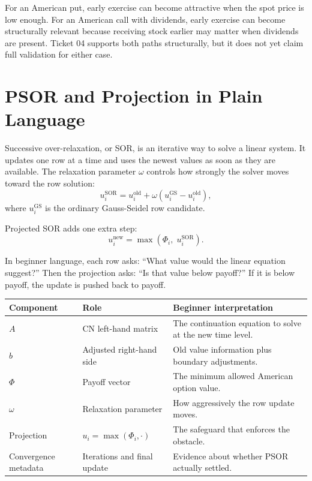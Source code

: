 \documentclass[11pt,a4paper]{article}
\begin{document}
For an American put, early exercise can become attractive when the spot price is low enough. For
an American call with dividends, early exercise can become structurally relevant because receiving
stock earlier may matter when dividends are present. Ticket 04 supports both paths structurally,
but it does not yet claim full validation for either case.

\section{PSOR and Projection in Plain Language}

Successive over-relaxation, or SOR, is an iterative way to solve a linear system. It updates one
row at a time and uses the newest values as soon as they are available. The relaxation parameter
\(\omega\) controls how strongly the solver moves toward the row solution:
\begin{equation}
  u_i^{\mathrm{SOR}} =
  u_i^{\mathrm{old}}
  + \omega\left(u_i^{\mathrm{GS}} - u_i^{\mathrm{old}}\right),
\end{equation}
where \(u_i^{\mathrm{GS}}\) is the ordinary Gauss-Seidel row candidate.

Projected SOR adds one extra step:
\begin{equation}
  u_i^{\mathrm{new}} =
  \max\left(\Phi_i,\; u_i^{\mathrm{SOR}}\right).
\end{equation}

In beginner language, each row asks: ``What value would the linear equation suggest?'' Then the
projection asks: ``Is that value below payoff?'' If it is below payoff, the update is pushed back
to payoff.

\begin{longtable}{L{0.24\textwidth}L{0.31\textwidth}L{0.33\textwidth}}
\toprule
Component & Role & Beginner interpretation \\
\midrule
\endhead
\(A\) & CN left-hand matrix & The continuation equation to solve at the new time level. \\
\(b\) & Adjusted right-hand side & Old value information plus boundary adjustments. \\
\(\Phi\) & Payoff vector & The minimum allowed American option value. \\
\(\omega\) & Relaxation parameter & How aggressively the row update moves. \\
Projection & \(u_i=\max(\Phi_i,\cdot)\) & The safeguard that enforces the obstacle. \\
Convergence metadata & Iterations and final update & Evidence about whether PSOR actually settled. \\
\bottomrule
\end{longtable}
\end{document}

